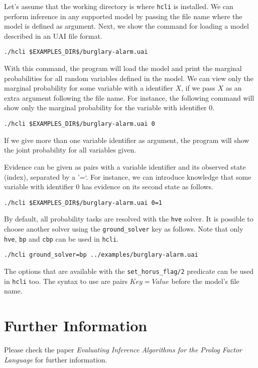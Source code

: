 \documentclass{article}
\begin{document}
Let's assume that the working directory is where \texttt{hcli} is installed. We can perform inference in any supported model by passing the file name where the model is defined as argument. Next, we show the command for loading a model described in an UAI file format.

\begin{verbatim}
./hcli $EXAMPLES_DIR$/burglary-alarm.uai
\end{verbatim}

With this command, the program will load the model and print the marginal probabilities for all random variables defined in the model. We can view only the marginal probability for some variable with a identifier $X$, if we pass $X$ as an extra argument following the file name. For instance, the following command will show only the marginal probability for the variable with identifier $0$.

\begin{verbatim}
./hcli $EXAMPLES_DIR$/burglary-alarm.uai 0
\end{verbatim}

If we give more than one variable identifier as argument, the program will show the joint probability for all variables given.

Evidence can be given as pairs with a variable identifier and its observed state (index), separated by a '=`. For instance, we can introduce knowledge that some variable with identifier $0$ has evidence on its second state as follows.

\begin{verbatim}
./hcli $EXAMPLES_DIR$/burglary-alarm.uai 0=1
\end{verbatim}

By default, all probability tasks are resolved with the \texttt{hve} solver. It is possible to choose another solver using the \texttt{ground\_solver} key as follows. Note that only \texttt{hve}, \texttt{bp} and \texttt{cbp} can be used in \texttt{hcli}.

\begin{verbatim}
./hcli ground_solver=bp ../examples/burglary-alarm.uai
\end{verbatim}

The options that are available with the \texttt{set\_horus\_flag/2} predicate can be used in \texttt{hcli} too. The syntax to use are pairs $Key=Value$ before the model's file name.

\section{Further Information}
Please check the paper \textit{Evaluating Inference Algorithms for the Prolog Factor Language} for further information.
\end{document}
